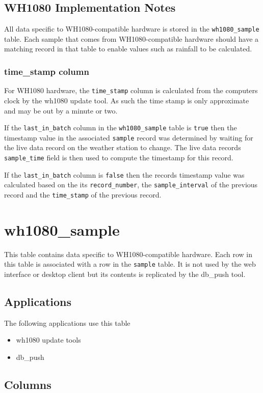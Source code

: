 \documentclass[a4paper,10pt]{book}
\begin{document}
\subsection{WH1080 Implementation Notes}
All data specific to WH1080-compatible hardware is stored in the \verb|wh1080_sample| table. Each sample that comes from WH1080-compatible hardware should have a matching record in that table to enable values such as rainfall to be calculated.

\subsubsection{time\_stamp column}
For WH1080 hardware, the \verb|time_stamp| column is calculated from the computers clock by the wh1080 update tool. As such the time stamp is only approximate and may be out by a minute or two.

If the \verb|last_in_batch| column in the \verb|wh1080_sample| table is \verb|true| then the timestamp value in the associated \verb|sample| record was determined by waiting for the live data record on the weather station to change. The live data records \verb|sample_time| field is then used to compute the timestamp for this record.

If the \verb|last_in_batch| column is \verb|false| then the records timestamp value was calculated based on the its \verb|record_number|, the \verb|sample_interval| of the previous record and the \verb|time_stamp| of the previous record.


\section{wh1080\_sample}
\label{tbl_wh1080_sample}
This table contains data specific to WH1080-compatible hardware. Each row in this table is associated with a row in the \verb|sample| table. It is not used by the web interface or desktop client but its contents is replicated by the db\_push tool.

\subsection{Applications}
The following applications use this table
\begin{itemize}
\item wh1080 update tools
\item db\_push
\end{itemize}

\subsection{Columns}
\end{document}
